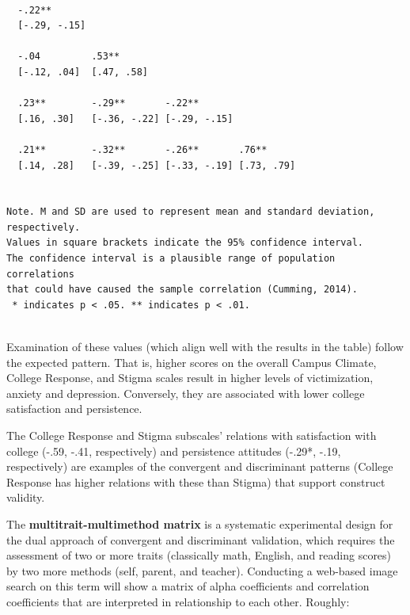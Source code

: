 \documentclass[
  english,
]{book}
\begin{document}
\begin{verbatim}
                                                   
                                                   
                                                   
                                                   
                                                   
                                                   
  -.22**                                           
  [-.29, -.15]                                     
                                                   
  -.04         .53**                               
  [-.12, .04]  [.47, .58]                          
                                                   
  .23**        -.29**       -.22**                 
  [.16, .30]   [-.36, -.22] [-.29, -.15]           
                                                   
  .21**        -.32**       -.26**       .76**     
  [.14, .28]   [-.39, -.25] [-.33, -.19] [.73, .79]
                                                   

Note. M and SD are used to represent mean and standard deviation, respectively.
Values in square brackets indicate the 95% confidence interval.
The confidence interval is a plausible range of population correlations 
that could have caused the sample correlation (Cumming, 2014).
 * indicates p < .05. ** indicates p < .01.
 
\end{verbatim}

Examination of these values (which align well with the results in the table) follow the expected pattern. That is, higher scores on the overall Campus Climate, College Response, and Stigma scales result in higher levels of victimization, anxiety and depression. Conversely, they are associated with lower college satisfaction and persistence.

The College Response and Stigma subscales' relations with satisfaction with college (-.59, -.41, respectively) and persistence attitudes (-.29*, -.19, respectively) are examples of the convergent and discriminant patterns (College Response has higher relations with these than Stigma) that support construct validity.

The \textbf{multitrait-multimethod matrix} is a systematic experimental design for the dual approach of convergent and discriminant validation, which requires the assessment of two or more traits (classically math, English, and reading scores) by two more methods (self, parent, and teacher). Conducting a web-based image search on this term will show a matrix of alpha coefficients and correlation coefficients that are interpreted in relationship to each other. Roughly:
\end{document}
